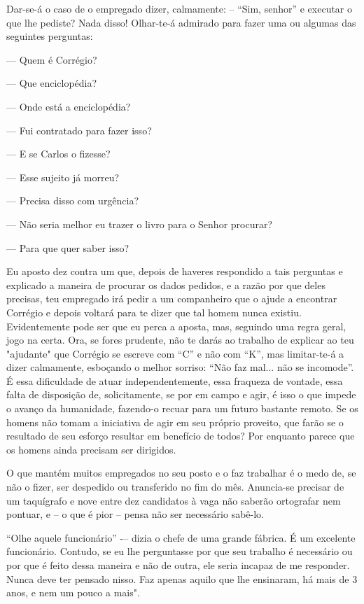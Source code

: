 Dar-se-á o caso de o empregado dizer, calmamente: –  ``Sim, senhor'' e executar o que lhe pediste? Nada disso! Olhar-te-á admirado para fazer uma ou algumas das seguintes perguntas:

---  Quem é Corrégio?

---  Que enciclopédia?

---  Onde está a enciclopédia?

---  Fui contratado para fazer isso?

--- E se Carlos o fizesse?

---  Esse sujeito já morreu?

--–  Precisa disso com urgência?

--–  Não seria melhor eu trazer o livro para o Senhor procurar?

–-- Para que quer saber isso?

Eu aposto dez contra um que, depois de haveres respondido a tais perguntas e explicado a maneira de procurar os dados pedidos, e a razão por que deles precisas, teu empregado irá pedir a um companheiro que o ajude a encontrar Corrégio e depois voltará para te dizer que tal homem nunca existiu. Evidentemente pode ser que eu perca a aposta, mas, seguindo uma regra geral, jogo na certa. Ora, se fores prudente, não te darás ao trabalho de explicar ao teu "ajudante" que Corrégio se escreve com ``C'' e não com ``K'', mas limitar-te-á a dizer calmamente, esboçando o melhor sorriso: ``Não faz mal... não se incomode''. É essa dificuldade de atuar independentemente, essa fraqueza de vontade, essa falta de disposição de, solicitamente, se por em campo e agir, é isso o que impede o avanço da humanidade, fazendo-o recuar para um futuro bastante remoto. Se os homens não tomam a iniciativa de agir em seu próprio proveito, que farão se o resultado de seu esforço resultar em benefício de todos? Por enquanto parece que os homens ainda precisam ser dirigidos.

O que mantém muitos empregados no seu posto e o faz trabalhar é o medo de, se não o fizer, ser despedido ou transferido no fim do mês. Anuncia-se precisar de um taquígrafo e nove entre dez candidatos à vaga não saberão ortografar nem pontuar, e –  o que é pior – pensa não ser necessário sabê-lo.

``Olhe aquele funcionário'' -–  dizia o chefe de uma grande fábrica. É um excelente funcionário. Contudo, se eu lhe perguntasse por que seu trabalho é necessário ou por que é feito dessa maneira e não de outra, ele seria incapaz de me responder. Nunca deve ter pensado nisso. Faz apenas aquilo que lhe ensinaram, há mais de 3 anos, e nem um pouco a mais".

